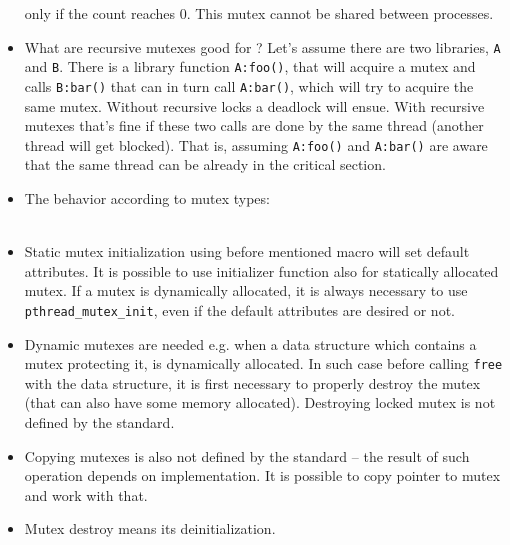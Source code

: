 \begin{itemize}
only if the count reaches 0. This mutex cannot be shared between processes.
\item What are recursive mutexes good for ? Let's assume there are two
libraries, \texttt{A} and \texttt{B}. There is a library
function \texttt{A:foo()}, that will acquire a mutex and calls \texttt{B:bar()}
that can in turn call \texttt{A:bar()}, which will try to acquire the same
mutex. Without recursive locks a deadlock will ensue. With recursive mutexes
that's fine if these two calls are done by the same thread (another thread will
get blocked). That is, assuming \texttt{A:foo()} and \texttt{A:bar()} are aware
that the same thread can be already in the critical section.
\item \label{MUTEXTAB} The behavior according to mutex types:\\
\\
\item Static mutex initialization using before mentioned macro will set default
attributes. It is possible to use initializer function also for statically
allocated mutex. If a mutex is dynamically allocated, it is always necessary to
use \texttt{pthread\_mutex\_init}, even if the default attributes are desired or
not.
\item Dynamic mutexes are needed e.g. when a data structure which contains a
mutex protecting it, is dynamically allocated.
In such case before calling \texttt{free} with the data structure, it is first
necessary to properly destroy the mutex (that can also have some memory
allocated). Destroying locked mutex is not defined by the standard.
\item Copying mutexes is also not defined by the standard -- the result of such
operation depends on implementation. It is possible to copy pointer to mutex
and work with that.
\item Mutex destroy means its deinitialization.
\end{itemize}

